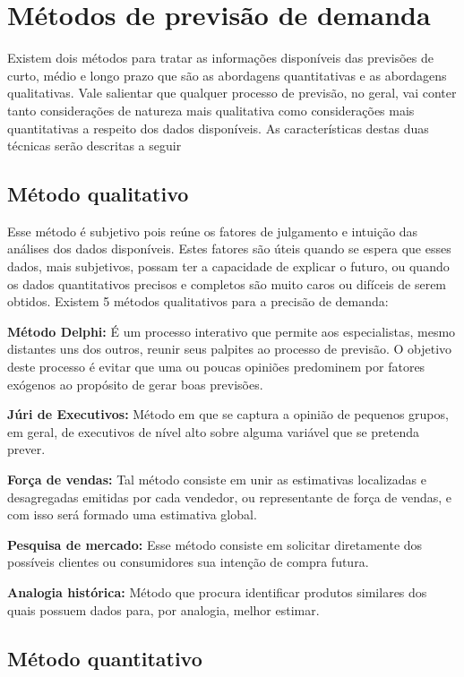 \section{Métodos de previsão de demanda}

Existem dois métodos para tratar as informações disponíveis das previsões de curto, médio e longo prazo que são as abordagens quantitativas e as abordagens qualitativas. Vale salientar que qualquer processo de previsão, no geral, vai conter tanto considerações de natureza mais qualitativa como considerações mais quantitativas a respeito dos dados disponíveis. As características destas duas técnicas serão descritas a seguir

\subsection{Método qualitativo}

Esse método é subjetivo pois reúne os fatores de julgamento e intuição das análises dos dados disponíveis. Estes fatores são úteis quando se espera que esses dados, mais subjetivos, possam ter a capacidade de explicar o futuro, ou quando os dados quantitativos precisos e completos são muito caros ou difíceis de serem obtidos. Existem 5 métodos qualitativos para a precisão de demanda:

\textbf{Método Delphi:} É um processo interativo que permite aos especialistas, mesmo distantes uns dos outros, reunir seus palpites ao processo de previsão. O objetivo deste processo é evitar que uma ou poucas opiniões predominem por fatores exógenos ao propósito de gerar boas previsões.

\textbf{Júri de Executivos:} Método em que se captura a opinião de pequenos grupos, em geral, de executivos de nível alto sobre alguma variável que se pretenda prever.

\textbf{Força de vendas:} Tal método consiste em unir as estimativas localizadas e desagregadas emitidas por cada vendedor, ou representante de força de vendas, e com isso será formado uma estimativa global.

\textbf{Pesquisa de mercado:} Esse método consiste em solicitar diretamente dos possíveis clientes ou consumidores sua intenção de compra futura.

\textbf{Analogia histórica:} Método que procura identificar produtos similares dos quais possuem dados para, por analogia, melhor estimar. %

\subsection{Método quantitativo}

